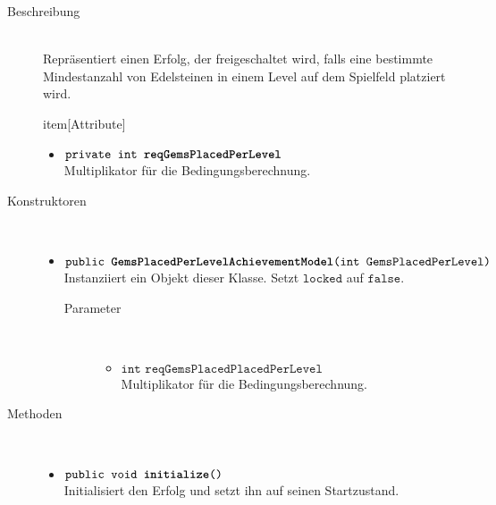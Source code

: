 \begin{description}
\item[Beschreibung] \hfill \\ Repräsentiert einen Erfolg, der freigeschaltet wird, falls eine bestimmte Mindestanzahl von Edelsteinen in einem Level auf dem Spielfeld platziert wird.
	
item[Attribute] \hfill \\
	\vspace{-.8cm}
	\begin{itemize}
		\item $\texttt{private int \textbf{reqGemsPlacedPerLevel}}$ \\ Multiplikator für die Bedingungsberechnung.
	\end{itemize}	
	
\item[Konstruktoren] \hfill \\
	\vspace{-.8cm}
	\begin{itemize}
		\item $\texttt{public \textbf{GemsPlacedPerLevelAchievementModel}(int GemsPlacedPerLevel)}$ \\ Instanziiert ein Objekt dieser Klasse. Setzt $\texttt{locked}$ auf $\texttt{false}$.
		\begin{description}
			\item[Parameter] \hfill \\
			\vspace{-.8cm}
			\begin{itemize}
				\item $\texttt{int reqGemsPlacedPlacedPerLevel}$ \\ Multiplikator für die Bedingungsberechnung.
			\end{itemize}
		\end{description}
	\end{itemize}
	
\item[Methoden] \hfill \\
	\vspace{-.8cm}
	\begin{itemize}
				\item $\texttt{public void \textbf{initialize}()}$ \\ Initialisiert den Erfolg und setzt ihn auf seinen Startzustand.
		

\end{itemize}
\end{description}
